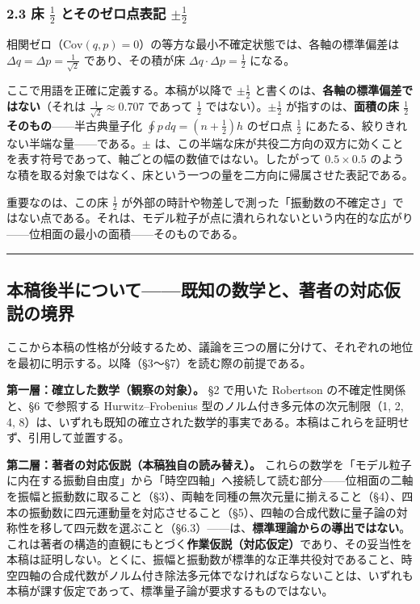 \documentclass[
]{ltjsarticle}
\begin{document}
\subsubsection{\texorpdfstring{2.3 床 \(\tfrac12\) とそのゼロ点表記
\(\pm\tfrac12\)}{2.3 床 \textbackslash tfrac12 とそのゼロ点表記 \textbackslash pm\textbackslash tfrac12}}\label{ux5e8a-tfrac12-ux3068ux305dux306eux30bcux30edux70b9ux8868ux8a18-pmtfrac12}

相関ゼロ（\(\mathrm{Cov}(q,p)=0\)）の等方な最小不確定状態では、各軸の標準偏差は
\(\Delta q=\Delta p=\tfrac{1}{\sqrt2}\) であり、その積が床
\(\Delta q\cdot\Delta p=\tfrac12\) になる。

ここで用語を正確に定義する。本稿が以降で \(\pm\tfrac12\)
と書くのは、\textbf{各軸の標準偏差ではない}（それは
\(\tfrac{1}{\sqrt2}\approx0.707\) であって \(\tfrac12\)
ではない）。\(\pm\tfrac12\) が指すのは、\textbf{面積の床 \(\tfrac12\)
そのもの}------半古典量子化 \(\oint p\,dq=(n+\tfrac12)h\) のゼロ点
\(\tfrac12\) にあたる、絞りきれない半端な量------である。\(\pm\)
は、この半端な床が共役二方向の双方に効くことを表す符号であって、軸ごとの幅の数値ではない。したがって
\(0.5\times0.5\)
のような積を取る対象ではなく、床という一つの量を二方向に帰属させた表記である。

重要なのは、この床 \(\tfrac12\)
が外部の時計や物差しで測った「振動数の不確定さ」ではない点である。それは、モデル粒子が点に潰れられないという内在的な広がり------位相面の最小の面積------そのものである。

\begin{center}\rule{0.5\linewidth}{0.5pt}\end{center}

\subsection{本稿後半について------既知の数学と、著者の対応仮説の境界}\label{ux672cux7a3fux5f8cux534aux306bux3064ux3044ux3066ux65e2ux77e5ux306eux6570ux5b66ux3068ux8457ux8005ux306eux5bfeux5fdcux4eeeux8aacux306eux5883ux754c}

ここから本稿の性格が分岐するため、議論を三つの層に分けて、それぞれの地位を最初に明示する。以降（§3〜§7）を読む際の前提である。

\textbf{第一層：確立した数学（観察の対象）。} §2 で用いた Robertson
の不確定性関係と、§6 で参照する Hurwitz--Frobenius
型のノルム付き多元体の次元制限（1, 2, 4,
8）は、いずれも既知の確立された数学的事実である。本稿はこれらを証明せず、引用して並置する。

\textbf{第二層：著者の対応仮説（本稿独自の読み替え）。}
これらの数学を「モデル粒子に内在する振動自由度」から「時空四軸」へ接続して読む部分------位相面の二軸を振幅と振動数に取ること（§3）、両軸を同種の無次元量に揃えること（§4）、四本の振動数に四元運動量を対応させること（§5）、四軸の合成代数に量子論の対称性を移して四元数を選ぶこと（§6.3）------は、\textbf{標準理論からの導出ではない}。これは著者の構造的直観にもとづく\textbf{作業仮説（対応仮定）}であり、その妥当性を本稿は証明しない。とくに、振幅と振動数が標準的な正準共役対であること、時空四軸の合成代数がノルム付き除法多元体でなければならないことは、いずれも本稿が課す仮定であって、標準量子論が要求するものではない。
\end{document}
